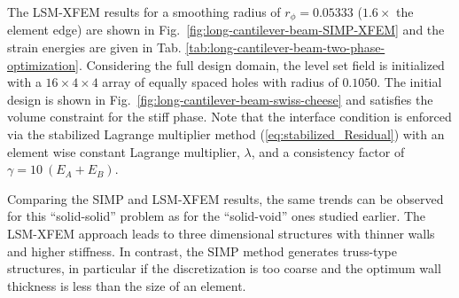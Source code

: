The LSM-XFEM results for a smoothing radius of $r_\phi = 0.05333$ ($1.6 \times$ the element edge) are shown in Fig.~\ref{fig:long-cantilever-beam-SIMP-XFEM} and the strain energies are given in Tab.
\ref{tab:long-cantilever-beam-two-phase-optimization}. Considering the full design domain, the level set field is initialized with a $16 \times 4 \times 4$ array of equally spaced holes with radius of $0.1050$. The initial design is shown in Fig.~\ref{fig:long-cantilever-beam-swiss-cheese} and satisfies the volume constraint for the stiff phase. Note that the interface condition is enforced via the stabilized Lagrange multiplier method (\ref{eq:stabilized_Residual}) with an element wise constant Lagrange multiplier, $\lambda$, and a consistency factor of $\gamma = 10 \ (E_A+E_B)$.

Comparing the SIMP and LSM-XFEM results, the same trends can be observed for this ``solid-solid'' problem as for the ``solid-void'' ones studied earlier. The LSM-XFEM approach leads to three dimensional structures with thinner walls and higher stiffness. In contrast, the SIMP method generates truss-type structures, in particular if the discretization is too coarse and the optimum wall thickness is less than the size of an element.


